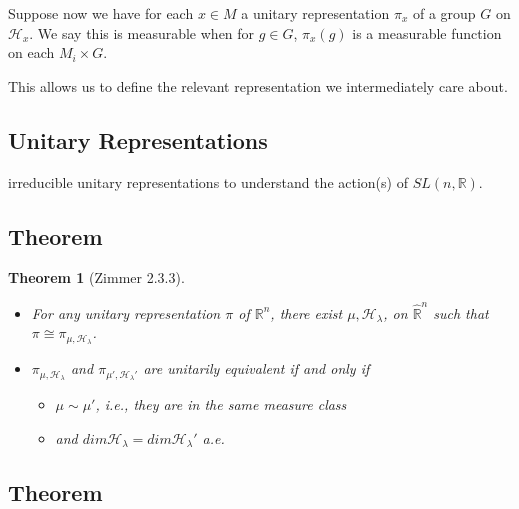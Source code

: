 \documentclass[
]{article}
\newtheorem{thm}{Theorem}
\begin{document}
Suppose now we have for each \(x \in M\) a unitary representation
\(\pi_x\) of a group \(G\) on \(\mathscr{H}_x\). We say this is
measurable when for \(g \in G\), \(\pi_x(g)\) is a measurable function
on each \(M_i \times G\).

This allows us to define the relevant representation we intermediately
care about.

\hypertarget{unitary-representations}{%
\subsection{Unitary Representations}\label{unitary-representations}}


irreducible unitary representations to understand the action(s) of
\(SL(n, \mathbb{R})\).

\hypertarget{theorem}{%
\subsection{Theorem}\label{theorem}}

\begin{thm}[Zimmer 2.3.3]
  \begin{itemize}
    \item For any unitary representation \(\pi\) of
      \(\mathbb{R}^n\), there exist \(\mu, \mathscr{H}_{\lambda}\), on
      \(\hat{\mathbb{R}}^n\) such that \(\pi \cong \pi_{\mu, \mathscr{H}_{\lambda}}\).
    \item \(\pi_{\mu, \mathscr{H}_{\lambda}}\) and
      \(\pi_{\mu', \mathscr{H}_{\lambda}'}\) are unitarily equivalent if and only if 
      \begin{itemize}
        \item \(\mu \sim \mu'\), i.e., they are in the same measure class
        \item and \(dim\mathscr{H}_{\lambda} = dim \mathscr{H}_{\lambda}'\) a.e.
      \end{itemize}
  \end{itemize}
\end{thm}

\hypertarget{theorem-1}{%
\subsection{Theorem}\label{theorem-1}}
\end{document}
